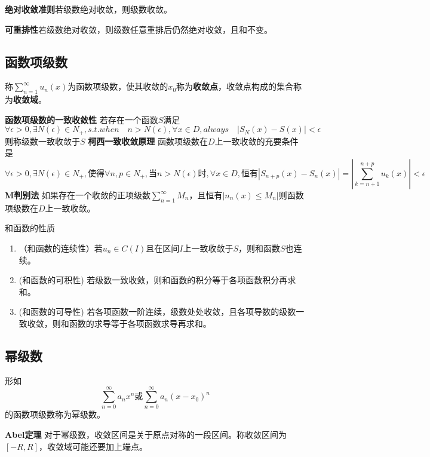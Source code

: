 \textbf{绝对收敛准则}\quad 若级数绝对收敛，则级数收敛。

\textbf{可重排性}\quad 若级数绝对收敛，则级数任意重排后仍然绝对收敛，且和不变。


\subsection{函数项级数}
称$ \sum_{n=1}^{\infty}u_n(x) $为函数项级数，使其收敛的$x_0$称为\textbf{收敛点}，收敛点构成的集合称为\textbf{收敛域}。

\noindent \textbf{函数项级数的一致收敛性} \quad
若存在一个函数$S$满足
\begin{equation}\label{key}
	\forall \epsilon>0, \exists N(\epsilon)\in N_+,s.t. when \quad n>N(\epsilon),\forall x \in D, always \quad |S_N(x)-S(x)|<\epsilon
\end{equation}
则称级数一致收敛于$ S $
\noindent \textbf{柯西一致收敛原理} \quad
函数项级数在$D$上一致收敛的充要条件是
\begin{equation}\label{key}
	\forall \epsilon>0, \exists N(\epsilon)\in N_+,\text{使得}\forall n,p \in N_+,\text{当}n>N(\epsilon)\text{时},\forall x \in D,\text{恒有}|S_{n+p}(x)-S_n(x)|=|\sum_{k=n+1}^{n+p}u_k(x)|<\epsilon
\end{equation}
\noindent \textbf{M判别法} \quad
如果存在一个收敛的正项级数$ \sum_{n=1}^{\infty}M_n $，且恒有$ |n_n(x)\leq M_n| $则函数项级数在$D$上一致收敛。

和函数的性质
\begin{enumerate}
	\item （和函数的连续性）若$ u_n \in C(I) $且在区间$ I $上一致收敛于$ S $，则和函数$ S $也连续。
	\item (和函数的可积性) 若级数一致收敛，则和函数的积分等于各项函数积分再求和。
	\item (和函数的可导性) 若各项函数一阶连续，级数处处收敛，且各项导数的级数一致收敛，则和函数的求导等于各项函数求导再求和。
\end{enumerate}
\subsection{幂级数}
形如
\begin{equation}\label{key}
	\sum_{n=0}^{\infty}a_nx^n\text{或}	\sum_{n=0}^{\infty}a_n(x-x_0)^n
\end{equation}
的函数项级数称为幂级数。

\noindent \textbf{Abel定理} \quad
对于幂级数，收敛区间是关于原点对称的一段区间。称收敛区间为$ [-R,R] $，收敛域可能还要加上端点。

